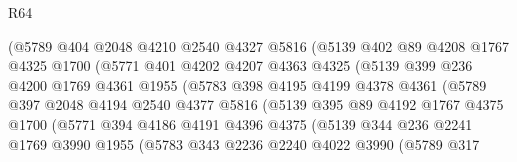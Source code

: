 \begin{lexlean}{R64}
\begin{coremodule}
                      (@5789
                        @404
                        @2048
                        @4210
                        @2540
                        @4327
                        @5816
                        (@5139
                          @402
                          @89
                          @4208
                          @1767
                          @4325
                          @1700
                          (@5771
                            @401
                            @4202
                            @4207
                            @4363
                            @4325
                            (@5139
                              @399
                              @236
                              @4200
                              @1769
                              @4361
                              @1955
                              (@5783
                                @398
                                @4195
                                @4199
                                @4378
                                @4361
                                (@5789
                                  @397
                                  @2048
                                  @4194
                                  @2540
                                  @4377
                                  @5816
                                  (@5139
                                    @395
                                    @89
                                    @4192
                                    @1767
                                    @4375
                                    @1700
                                    (@5771
                                      @394
                                      @4186
                                      @4191
                                      @4396
                                      @4375
                                      (@5139
                                        @344
                                        @236
                                        @2241
                                        @1769
                                        @3990
                                        @1955
                                        (@5783
                                          @343
                                          @2236
                                          @2240
                                          @4022
                                          @3990
                                          (@5789
                                            @317

\end{coremodule}
\end{lexlean}

